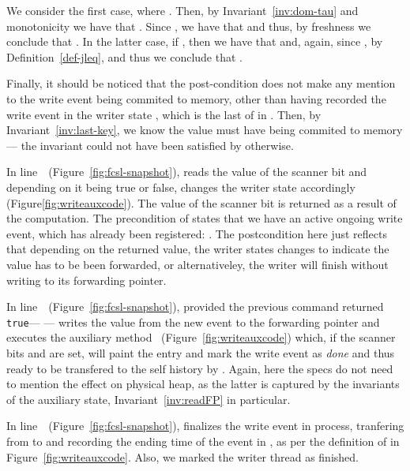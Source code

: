 We consider the first case, where . Then, by
Invariant~\ref{inv:dom-tau} and monotonicity we have that . Since , we have that  and thus, by freshness we conclude that
. In the latter case, if , then we have that  and, again, since , by
Definition~\ref{def-jleq},  and thus we
conclude that .



Finally, it should be noticed that the post-condition does not make
any mention to the write event being commited to memory, other than
having recorded the write event in the writer state , which is
the last of  in . Then, by
Invariant~\ref{inv:last-key}, we know the value must have being
commited to memory--- the invariant could not have been satisfied by
 otherwise.









In line~\lineWrtChk~(Figure~\ref{fig:fcsl-snapshot}),  reads the value of the scanner
bit  and depending on it being true or false,  changes
the writer state accordingly (Figure\ref{fig:writeauxcode}). The value
of the scanner bit  is returned as a result of the
computation. The precondition of  states that we have an
active ongoing write event, which has already been registered: . The postcondition here just reflects that
depending on the returned value, the writer states changes to indicate
the value has to be been forwarded, or alternativeley, the writer will
finish without writing to its forwarding pointer.









In line~\lineWrtFwd~(Figure~\ref{fig:fcsl-snapshot}), provided the
previous command returned {\tt true}--- \ie  ---  writes the value
from the new event to the forwarding pointer  and executes
the auxiliary method ~(Figure~\ref{fig:writeauxcode})
which, if the scanner bits  and  are set, will paint the
entry  and mark the write event as {\it done} and
thus ready to be transfered to the self history by
. Again, here the specs do not need to mention the
effect on physical heap, as the latter is captured by the invariants
of the auxiliary state, Invariant~\ref{inv:readFP} in particular.








In line~\lineWrtFnz~(Figure~\ref{fig:fcsl-snapshot}),  finalizes the write event in process,
tranfering  from  to  and recording the
ending time of the event in , as per the definition of
 in Figure~\ref{fig:writeauxcode}. Also, we marked the
writer thread as finished.


